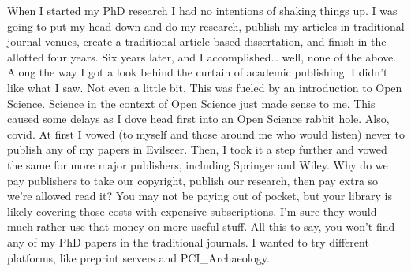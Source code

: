 \documentclass[
  b5paper,
]{book}
\begin{document}
When I started my PhD research I had no intentions of shaking things up.
I was going to put my head down and do my research, publish my articles
in traditional journal venues, create a traditional article-based
dissertation, and finish in the allotted four years. Six years later,
and I accomplished\ldots{} well, none of the above. Along the way I got
a look behind the curtain of academic publishing. I didn't like what I
saw. Not even a little bit. This was fueled by an introduction to Open
Science. Science in the context of Open Science just made sense to me.
This caused some delays as I dove head first into an Open Science rabbit
hole. Also, covid. At first I vowed (to myself and those around me who
would listen) never to publish any of my papers in Evilseer. Then, I
took it a step further and vowed the same for more major publishers,
including Springer and Wiley. Why do we pay publishers to take our
copyright, publish our research, then pay extra so we're allowed read
it? You may not be paying out of pocket, but your library is likely
covering those costs with expensive subscriptions. I'm sure they would
much rather use that money on more useful stuff. All this to say, you
won't find any of my PhD papers in the traditional journals. I wanted to
try different platforms, like preprint servers and PCI\_Archaeology.
\end{document}
